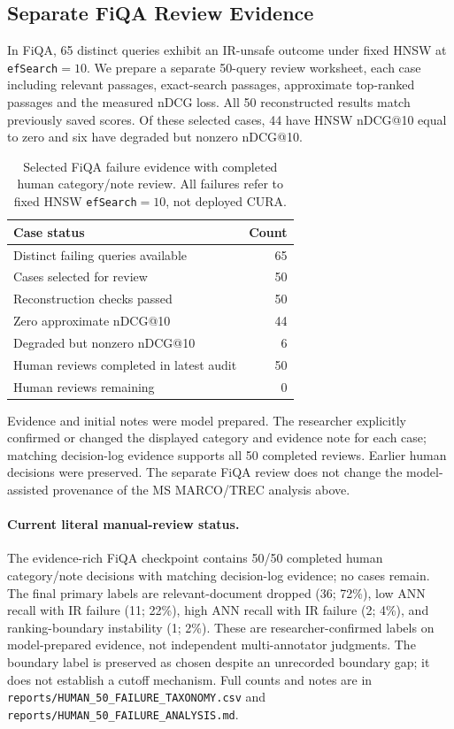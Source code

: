 \documentclass[10pt,twocolumn]{article}
\newcommand{\ef}{\texttt{efSearch}}
\begin{document}
\subsection{Separate FiQA Review Evidence}

In FiQA, 65 distinct queries exhibit an IR-unsafe outcome under fixed HNSW at \ef$=10$. We prepare a separate 50-query review worksheet, each case including relevant passages, exact-search passages, approximate top-ranked passages and the measured nDCG loss. All 50 reconstructed results match previously saved scores. Of these selected cases, 44 have HNSW nDCG@10 equal to zero and six have degraded but nonzero nDCG@10.

\begin{table}[!t]
\centering
\caption{Selected FiQA failure evidence with completed human category/note review. All failures refer to fixed HNSW \ef$=10$, not deployed CURA.}
\label{tab:fiqa_manual}
\begin{tabular}{lr}
\toprule
Case status & Count\\
\midrule
Distinct failing queries available & 65\\
Cases selected for review & 50\\
Reconstruction checks passed & 50\\
Zero approximate nDCG@10 & 44\\
Degraded but nonzero nDCG@10 & 6\\
Human reviews completed in latest audit & 50\\
Human reviews remaining & 0\\
\bottomrule
\end{tabular}
\end{table}

Evidence and initial notes were model prepared. The researcher explicitly confirmed or changed the displayed category and evidence note for each case; matching decision-log evidence supports all 50 completed reviews. Earlier human decisions were preserved. The separate FiQA review does not change the model-assisted provenance of the MS MARCO/TREC analysis above.


\paragraph{Current literal manual-review status.}
The evidence-rich FiQA checkpoint contains 50/50 completed human category/note decisions with matching decision-log evidence; no cases remain. The final primary labels are relevant-document dropped (36; 72\%), low ANN recall with IR failure (11; 22\%), high ANN recall with IR failure (2; 4\%), and ranking-boundary instability (1; 2\%). These are researcher-confirmed labels on model-prepared evidence, not independent multi-annotator judgments. The boundary label is preserved as chosen despite an unrecorded boundary gap; it does not establish a cutoff mechanism. Full counts and notes are in \texttt{reports/HUMAN\_50\_FAILURE\_TAXONOMY.csv} and \texttt{reports/HUMAN\_50\_FAILURE\_ANALYSIS.md}.
\end{document}
